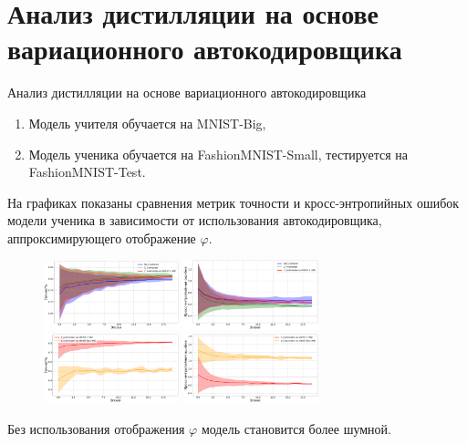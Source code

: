 \documentclass[10pt,pdf,hyperref={unicode}]{beamer}
\begin{document}
\section{Анализ дистилляции на основе вариационного автокодировщика}
\begin{frame}{Анализ дистилляции на основе вариационного автокодировщика}
\justifying
\begin{enumerate}[1)]
    \item Модель учителя обучается на MNIST-Big,
    \item Модель ученика обучается на FashionMNIST-Small, тестируется на FashionMNIST-Test.
\end{enumerate}

\par
На графиках показаны сравнения метрик точности и кросс-энтропийных ошибок модели ученика в зависимости от использования автокодировщика, аппроксимирующего отображение $\varphi$.

\begin{figure}[h!]
\includegraphics[width=0.35\textwidth]{results/vae_acc.png}
\includegraphics[width=0.35\textwidth]{results/vae_loss.png}
\includegraphics[width=0.35\textwidth]{results/vae_acc_comparison.png}
\includegraphics[width=0.35\textwidth]{results/vae_loss_comparison.png}
\end{figure}

Без использования отображения $\varphi$ модель становится более шумной.

\end{frame}
\end{document}
